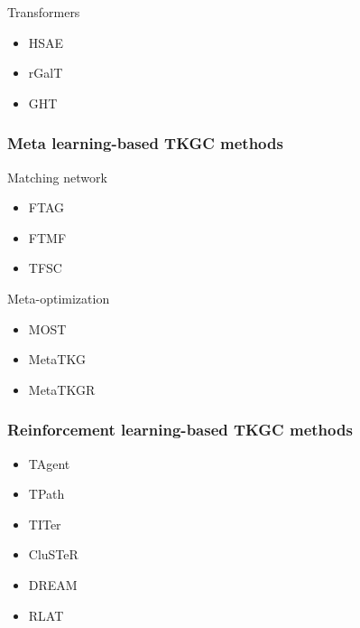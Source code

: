 \documentclass[12pt]{article}
\begin{document}
Transformers
\begin{itemize}
    \item HSAE
    \item rGalT
    \item GHT
\end{itemize}

\subsubsection{Meta learning-based TKGC methods}

Matching network 
\begin{itemize}
    \item FTAG
    \item FTMF
    \item TFSC
\end{itemize}

Meta-optimization
\begin{itemize}
    \item MOST
    \item MetaTKG
    \item MetaTKGR
\end{itemize}

\subsubsection{Reinforcement learning-based TKGC methods}

\begin{itemize}
    \item TAgent
    \item TPath 
    \item TITer 
    \item CluSTeR
    \item DREAM 
    \item RLAT
\end{itemize}

\printbibliography
\end{document}
